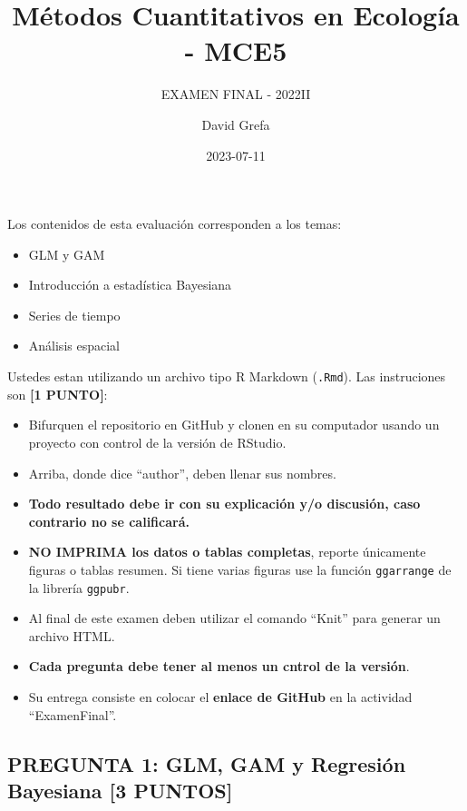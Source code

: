 \documentclass[
]{article}
\title{Métodos Cuantitativos en Ecología - MCE5}
\subtitle{EXAMEN FINAL - 2022II}
\author{David Grefa}
\date{2023-07-11}
\begin{document}
\maketitle

{
\setcounter{tocdepth}{4}
\tableofcontents
}
Los contenidos de esta evaluación corresponden a los temas:

\begin{itemize}
\item
  GLM y GAM
\item
  Introducción a estadística Bayesiana
\item
  Series de tiempo
\item
  Análisis espacial
\end{itemize}

Ustedes estan utilizando un archivo tipo R Markdown (\texttt{.Rmd}). Las
instruciones son \textbf{{[}1 PUNTO{]}}:

\begin{itemize}
\item
  Bifurquen el repositorio en GitHub y clonen en su computador usando un
  proyecto con control de la versión de RStudio.
\item
  Arriba, donde dice ``author'', deben llenar sus nombres.
\item
  \textbf{Todo resultado debe ir con su explicación y/o discusión, caso
  contrario no se calificará.}
\item
  \textbf{NO IMPRIMA los datos o tablas completas}, reporte únicamente
  figuras o tablas resumen. Si tiene varias figuras use la función
  \texttt{ggarrange} de la librería \texttt{ggpubr}.
\item
  Al final de este examen deben utilizar el comando ``Knit'' para
  generar un archivo HTML.
\item
  \textbf{Cada pregunta debe tener al menos un cntrol de la versión}.
\item
  Su entrega consiste en colocar el \textbf{enlace de GitHub} en la
  actividad ``ExamenFinal''.
\end{itemize}

\hypertarget{pregunta-1-glm-gam-y-regresiuxf3n-bayesiana-3-puntos}{%
\subsection{\texorpdfstring{\textbf{PREGUNTA 1: GLM, GAM y Regresión
Bayesiana {[}3
PUNTOS{]}}}{PREGUNTA 1: GLM, GAM y Regresión Bayesiana {[}3 PUNTOS{]}}}\label{pregunta-1-glm-gam-y-regresiuxf3n-bayesiana-3-puntos}}
\end{document}
